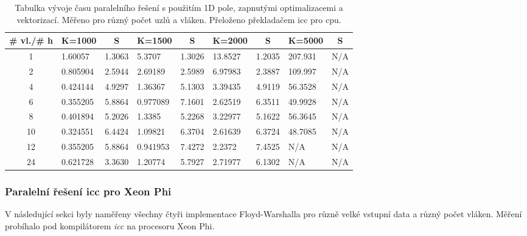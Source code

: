 \documentclass[a4paper,11pt]{article}
\begin{document}
  \begin{table}[ht]
  \begin{center}
   \begin{tabular}{|c|l|c|l|c|l|c|l|c|}
    \hline 
    \# vl./\# h & K=1000 & S & K=1500 & S & K=2000 & S & K=5000 & S \\
   \hline 
   \hline 
   1 & 1.60057 & 1.3063 & 5.3707 & 1.3026 & 13.8527 & 1.2035 & 207.931 & N/A\\
   \hline
    2 & 0.805904 & 2.5944 & 2.69189 & 2.5989 & 6.97983 & 2.3887 & 109.997 & N/A\\
   \hline
    4 & 0.424144 & 4.9297 & 1.36367 & 5.1303 & 3.39435 & 4.9119 & 56.3528 & N/A\\
   \hline
    6 & 0.355205 & 5.8864 & 0.977089 & 7.1601 & 2.62519 & 6.3511 & 49.9928 & N/A\\
   \hline
    8 & 0.401894 & 5.2026 & 1.3385 & 5.2268 & 3.22977 & 5.1622 & 56.3645 & N/A\\
      \hline
    10 & 0.324551 & 6.4424 & 1.09821 & 6.3704 & 2.61639 & 6.3724 & 48.7085 & N/A\\ 
      \hline
    12 & 0.355205 & 5.8864 & 0.941953 & 7.4272 & 2.2372 & 7.4525 & N/A & N/A \\
      \hline
    24 & 0.621728 & 3.3630 & 1.20774 & 5.7927 & 2.71977 & 6.1302 & N/A & N/A\\
   \hline    
    \end{tabular}
   \caption{Tabulka vývoje času paralelního řešení s použitím 1D pole, zapnutými optimalizacemi a vektorizací. Měřeno pro různý počet uzlů a vláken. Přeloženo 
   překladačem icc pro cpu.} 
   \label{tab.tab22}
  \end{center}   
  \end{table}
  \clearpage
  \subsubsection{Paralelní řešení icc pro Xeon Phi}
    V následující sekci byly naměřeny všechny čtyři implementace Floyd-Warshalla pro různě velké vstupní data a 
  různý počet vláken. Měření probíhalo pod kompilátorem \textit{icc} na procesoru Xeon Phi.
  
\end{document}
